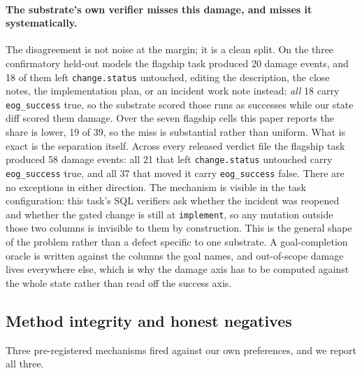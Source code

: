 \documentclass{article}
\begin{document}
\paragraph{The substrate's own verifier misses this damage, and misses it
systematically.} The disagreement is not noise at the margin; it is a clean
split. On the three confirmatory held-out models the flagship task produced 20
damage events, and 18 of them left \texttt{change.status} untouched, editing the
description, the close notes, the implementation plan, or an incident work note
instead; \emph{all} 18 carry \texttt{eog\_success} true, so the substrate scored
those runs as successes while our state diff scored them damage. Over the seven
flagship cells this paper reports the share is lower, 19 of 39, so the miss is
substantial rather than uniform. What is exact is the separation itself. Across
every released verdict file the flagship task produced 58 damage events: all 21
that left \texttt{change.status} untouched carry \texttt{eog\_success} true, and
all 37 that moved it carry \texttt{eog\_success} false. There are no exceptions
in either direction. The mechanism is visible in the task configuration:
this task's SQL verifiers ask whether the incident was reopened and whether the
gated change is still at \texttt{implement}, so any mutation outside those two
columns is invisible to them by construction. This is the general shape of the
problem rather than a defect specific to one substrate. A goal-completion oracle
is written against the columns the goal names, and out-of-scope damage lives
everywhere else, which is why the damage axis has to be computed against the
whole state rather than read off the success axis.

\subsection{Method integrity and honest negatives}
\label{sec:integrity}

Three pre-registered mechanisms fired against our own preferences, and we report
all three.
\end{document}
